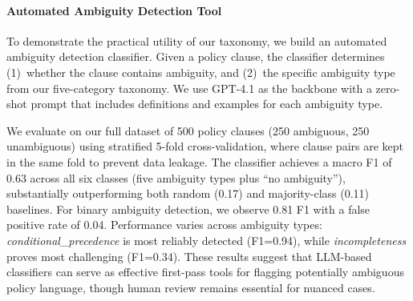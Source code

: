 \paragraph{Automated Ambiguity Detection Tool}
To demonstrate the practical utility of our taxonomy, we build an automated ambiguity detection classifier.
Given a policy clause, the classifier determines (1)~whether the clause contains ambiguity, and (2)~the specific ambiguity type from our five-category taxonomy.
We use GPT-4.1 as the backbone with a zero-shot prompt that includes definitions and examples for each ambiguity type.

We evaluate on our full dataset of 500 policy clauses (250 ambiguous, 250 unambiguous) using stratified 5-fold cross-validation, where clause pairs are kept in the same fold to prevent data leakage.
The classifier achieves a macro F1 of 0.63 across all six classes (five ambiguity types plus ``no ambiguity''), substantially outperforming both random (0.17) and majority-class (0.11) baselines.
For binary ambiguity detection, we observe 0.81 F1 with a false positive rate of 0.04.
Performance varies across ambiguity types: \textit{conditional\_precedence} is most reliably detected (F1=0.94), while \textit{incompleteness} proves most challenging (F1=0.34).
These results suggest that LLM-based classifiers can serve as effective first-pass tools for flagging potentially ambiguous policy language, though human review remains essential for nuanced cases.
